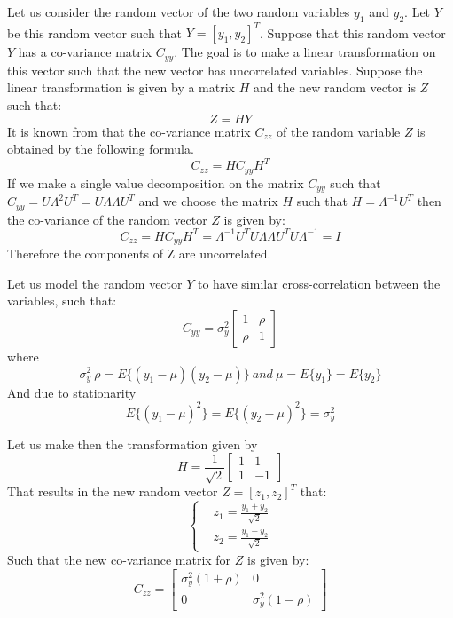 Let us consider the random vector of the two random variables $y_1$ and $y_2$. Let $Y$ be this random vector such that $Y=[y_1, y_2]^T$. Suppose that this random vector $Y$ has a co-variance matrix $C_{yy}$. The goal is to make a linear transformation on this vector such that the new vector has uncorrelated variables. Suppose the linear transformation is given by a matrix $H$ and the new random vector is $Z$ such that:
\begin{equation}
    Z=HY
\end{equation}{}
It is known from \cite{papoulis} that the co-variance matrix $C_{zz}$ of the random variable $Z$ is obtained by the following formula.
\begin{equation}
    C_{zz} = HC_{yy}H^T
\end{equation}
If we make a single value decomposition on the matrix $C_{yy}$ such that $C_{yy} = U\Lambda^2U^T 
=U\Lambda \Lambda U^T$ and we choose the matrix $H$ such that $H = \Lambda^{-1}U^T$ then the co-variance of the random vector $Z$ is given by:
\begin{equation}
    C_{zz} = HC_{yy}H^T = \Lambda^{-1}U^T U\Lambda \Lambda U^T U \Lambda^{-1} = I
\end{equation}{}
Therefore the components of Z are uncorrelated.

Let us model the random vector $Y$ to have similar cross-correlation between the variables, such that:
\begin{equation}
    C_{yy} = \sigma_y^2 
    \begin{bmatrix}
    1&\rho\\
    \rho&1
    \end{bmatrix}
\end{equation}{}
where
\begin{equation}
    \sigma_y^2\ \rho = E\{(y_1-\mu)(y_2-\mu)\} \ and \ \mu = E\{y_1\} = E\{y_2\}
\end{equation}{}
And due to stationarity 
\begin{equation}
    E\{(y_1-\mu)^2\}=E\{(y_2-\mu)^2\} = \sigma_y^2
\end{equation}{}

Let us make then the transformation given by
\begin{equation}
H =\frac{1}{\sqrt{2}} 
\begin{bmatrix}
1&1\\
1&-1
\end{bmatrix}{}
\end{equation}
That results in the new random vector $Z=[z_1, z_2]^T$ that:
\begin{equation}
\begin{cases}
&z_1 =\frac{y_1+y_2}{\sqrt{2}}\\
&z_2 = \frac{y_1-y_2}{\sqrt{2}}
\end{cases}
\end{equation}
Such that the new co-variance matrix for $Z$ is given by:
\begin{equation}
C_{zz}=
    \begin{bmatrix}
    \sigma_y^2 (1+\rho) & 0\\
    0 & \sigma_y^2 (1-\rho)
    \end{bmatrix}{}
\end{equation}{}

